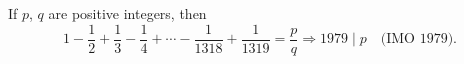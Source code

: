 If $p$, $q$ are positive integers, then
\[ 1 - \frac{1}{2} + \frac{1}{3} - \frac{1}{4} + \cdots - \frac{1}{1318} + \frac{1}{1319} = \frac{p}{q} \Longrightarrow 1979 \mid p \quad \text{(IMO 1979).} \]
